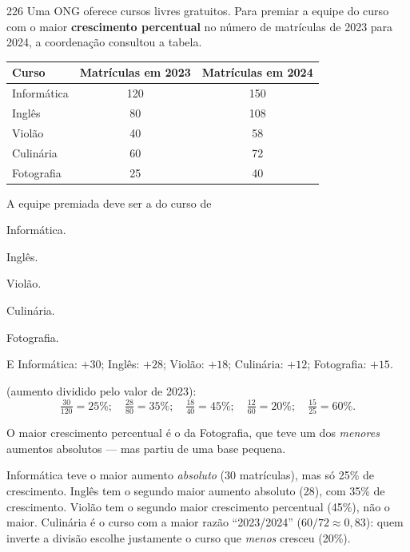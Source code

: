 \begin{questaoinedita}{2}{26}
Uma ONG oferece cursos livres gratuitos. Para premiar a equipe do curso com
o maior \textbf{crescimento percentual} no número de matrículas de 2023 para
2024, a coordenação consultou a tabela.

\begin{center}\small
\begin{tabular}{lcc}
\toprule
\textbf{Curso} & \textbf{Matrículas em 2023} & \textbf{Matrículas em 2024}\\
\midrule
Informática & 120 & 150\\
Inglês & 80 & 108\\
Violão & 40 & 58\\
Culinária & 60 & 72\\
Fotografia & 25 & 40\\
\bottomrule
\end{tabular}
\end{center}

A equipe premiada deve ser a do curso de
\begin{alternativas}
\item Informática.
\item Inglês.
\item Violão.
\item Culinária.
\item Fotografia.
\end{alternativas}
\end{questaoinedita}
\begin{resolucao}{E}
 Informática: $+30$; Inglês: $+28$; Violão: $+18$; Culinária: $+12$; Fotografia: $+15$.

 (aumento dividido pelo valor de 2023):
\[
\tfrac{30}{120}=25\%;\quad \tfrac{28}{80}=35\%;\quad \tfrac{18}{40}=45\%;\quad
\tfrac{12}{60}=20\%;\quad \tfrac{15}{25}=60\%.
\]

 O maior crescimento percentual é o da Fotografia, que teve um dos \emph{menores} aumentos absolutos — mas partiu de uma base pequena.

\begin{distratores}
 Informática teve o maior aumento \emph{absoluto} (30 matrículas), mas só 25\% de crescimento.
 Inglês tem o segundo maior aumento absoluto (28), com 35\% de crescimento.
 Violão tem o segundo maior crescimento percentual (45\%), não o maior.
 Culinária é o curso com a maior razão “2023/2024” ($60/72\approx0{,}83$): quem inverte a divisão escolhe justamente o curso que \emph{menos} cresceu (20\%).
\end{distratores}
\end{resolucao}


